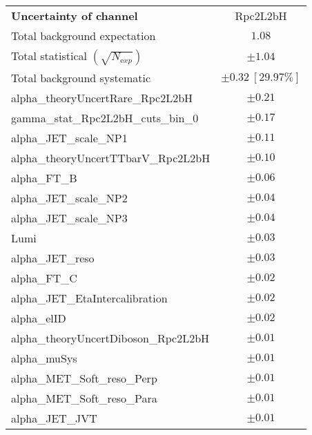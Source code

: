 
\begin{table}
\begin{center}
\setlength{\tabcolsep}{0.0pc}
\begin{tabular*}{\textwidth}{@{\extracolsep{\fill}}lc}
\noalign{\smallskip}\hline\noalign{\smallskip}
{\bfseries Uncertainty of channel}                                    & Rpc2L2bH            \\
\noalign{\smallskip}\hline\noalign{\smallskip}
Total background expectation             &  $1.08$       \\
\noalign{\smallskip}\hline\noalign{\smallskip}
Total statistical $(\sqrt{N_{\mathrm exp}})$              & $\pm 1.04$       \\
Total background systematic               & $\pm 0.32\ [29.97\%] $             \\
\noalign{\smallskip}\hline\noalign{\smallskip}
\noalign{\smallskip}\hline\noalign{\smallskip}
alpha\_theoryUncertRare\_Rpc2L2bH         & $\pm 0.21$       \\
gamma\_stat\_Rpc2L2bH\_cuts\_bin\_0         & $\pm 0.17$       \\
alpha\_JET\_scale\_NP1         & $\pm 0.11$       \\
alpha\_theoryUncertTTbarV\_Rpc2L2bH         & $\pm 0.10$       \\
alpha\_FT\_B         & $\pm 0.06$       \\
alpha\_JET\_scale\_NP2         & $\pm 0.04$       \\
alpha\_JET\_scale\_NP3         & $\pm 0.04$       \\
Lumi         & $\pm 0.03$       \\
alpha\_JET\_reso         & $\pm 0.03$       \\
alpha\_FT\_C         & $\pm 0.02$       \\
alpha\_JET\_EtaIntercalibration         & $\pm 0.02$       \\
alpha\_elID         & $\pm 0.02$       \\
alpha\_theoryUncertDiboson\_Rpc2L2bH         & $\pm 0.01$       \\
alpha\_muSys         & $\pm 0.01$       \\
alpha\_MET\_Soft\_reso\_Perp         & $\pm 0.01$       \\
alpha\_MET\_Soft\_reso\_Para         & $\pm 0.01$       \\
alpha\_JET\_JVT         & $\pm 0.01$       \\

\end{tabular*}
\end{center}
\end{table}
